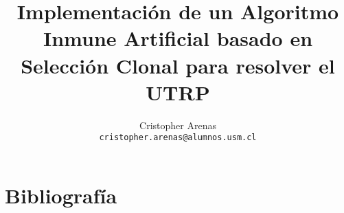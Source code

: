 \documentclass{llncs}
\title{Implementación de un Algoritmo Inmune Artificial basado en Selección Clonal para resolver el UTRP}
\author{Cristopher Arenas\\\texttt{cristopher.arenas@alumnos.usm.cl}}
\institute{Departamento de Informática\\Universidad Técnica Federico Santa María}
\begin{document}
\maketitle












%

\section{Bibliograf\'ia}


\end{document}
